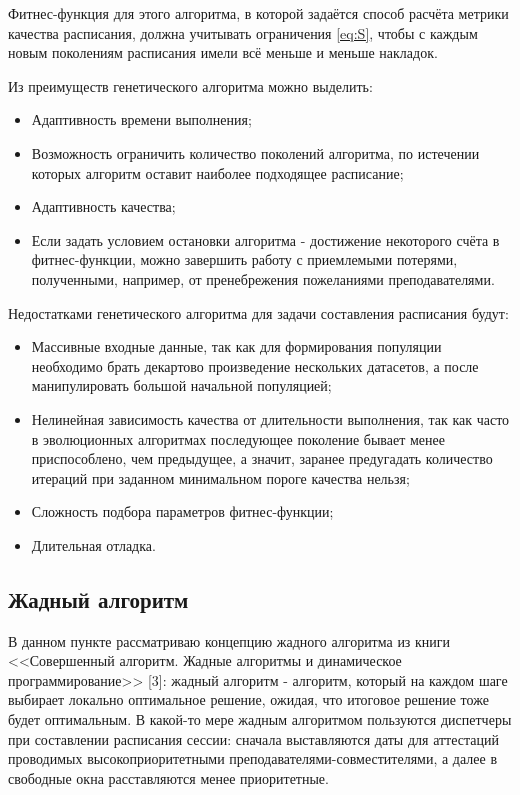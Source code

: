 Фитнес-функция для этого алгоритма, в которой задаётся способ расчёта метрики качества расписания, должна учитывать ограничения \eqref{eq:S}, чтобы с каждым новым поколениям расписания имели всё меньше и меньше накладок.

Из  преимуществ генетического алгоритма можно выделить:
\begin{itemize}
	\item Адаптивность времени выполнения;
	\item Возможность ограничить количество поколений алгоритма, по истечении которых алгоритм оставит наиболее подходящее расписание;
	\item Адаптивность качества;
	\item Если задать условием остановки алгоритма - достижение некоторого счёта в фитнес-функции, можно завершить работу с приемлемыми потерями, полученными, например, от пренебрежения пожеланиями преподавателями.
\end{itemize}

Недостатками генетического алгоритма для задачи составления расписания будут:
\begin{itemize}
	\item Массивные входные данные, так как для формирования популяции необходимо брать декартово произведение нескольких датасетов, а после манипулировать большой начальной популяцией;
	\item Нелинейная зависимость качества от длительности выполнения, так как часто в эволюционных алгоритмах последующее поколение бывает менее приспособлено, чем предыдущее, а значит, заранее предугадать количество итераций при заданном минимальном пороге качества нельзя;
	\item Сложность подбора параметров фитнес-функции;
	\item Длительная отладка.
\end{itemize}

\subsection{Жадный алгоритм}
В данном пункте рассматриваю концепцию жадного алгоритма из книги <<Совершенный алгоритм. Жадные алгоритмы и динамическое программирование>> [3]: жадный алгоритм - алгоритм, который на каждом шаге выбирает локально оптимальное решение, ожидая, что итоговое решение тоже будет оптимальным. В какой-то мере жадным алгоритмом пользуются диспетчеры при составлении расписания сессии: сначала выставляются даты для аттестаций проводимых высокоприоритетными преподавателями-совместителями, а далее в свободные окна расставляются менее приоритетные.

